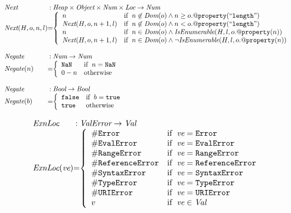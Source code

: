 \documentclass[a4paper, leqno]{amsart}
\newcommand{\false}{{\tt false}}
\newcommand{\true}{{\tt true}}
\newcommand{\Bool}{\emph{Bool}}
\newcommand{\ValError}{\emph{ValError}}
\newcommand{\Val}{\emph{Val}}
\newcommand{\Loc}{\emph{Loc}}
\newcommand{\Obj}{\emph{Object}}
\newcommand{\Num}{\emph{Num}}
\newcommand{\Heap}{\emph{Heap}}
\newcommand{\hf}[1]{\emph{#1}}
\newcommand{\ifc}[1]{{\rm if}\begin{array}[t]{l}#1\end{array}}
\begin{document}
\[\begin{array}{l@{}c@{}l}
\hf{Next} & :& \Heap \times \Obj \times \Num \times \Loc \rightarrow \Num \\
\hf{Next}(H, o, n, l) &=&
\left\{ \begin{array}{ll}
n &\ifc{n \not\in\hf{Dom}(o) \wedge n \ge o.{\tt@property}(``{\tt length}")}\\
\hf{Next}(H, o, n+1, l) &\ifc{n \not\in\hf{Dom}(o) \wedge n < o.{\tt@property}(``{\tt length}")}\\
n &\ifc{n \in\hf{Dom}(o) \wedge \hf{IsEnumerable}(H, l, o.{\tt@property}(n))}\\
\hf{Next}(H, o, n+1, l)
 &\ifc{n \in\hf{Dom}(o) \wedge \neg\hf{IsEnumerable}(H, l, o.{\tt@property}(n))}\\
\end{array}
\right.
\\\\

\hf{Negate} & :& \Num \rightarrow \Num \\
\hf{Negate}(n) &=&
\left\{ \begin{array}{ll}
{\tt NaN} &\ifc{n = {\tt NaN}}\\
0-n &\mbox{otherwise}\\
\end{array}
\right.
\\\\

\hf{Negate} & :& \Bool \rightarrow \Bool \\
\hf{Negate}(b) &=&
\left\{ \begin{array}{ll}
\false &\ifc{b = \true}\\
\true &\mbox{otherwise}\\
\end{array}
\right.
\end{array}
\]

\[
\begin{array}{l@{}c@{}l}
\hf{ExnLoc} & :& \ValError \rightarrow \Val \\
\hf{ExnLoc}(\emph{ve}) &=&
\left\{ \begin{array}{ll}
{\tt \#Error} &\ifc{\emph{ve} = {\tt Error}}\\
{\tt \#EvalError} &\ifc{\emph{ve} = {\tt EvalError}}\\
{\tt \#RangeError} &\ifc{\emph{ve} = {\tt RangeError}}\\
{\tt \#ReferenceError} &\ifc{\emph{ve} = {\tt ReferenceError}}\\
{\tt \#SyntaxError} &\ifc{\emph{ve} = {\tt SyntaxError}}\\
{\tt \#TypeError} &\ifc{\emph{ve} = {\tt TypeError}}\\
{\tt \#URIError} &\ifc{\emph{ve} = {\tt URIError}}\\
v&\ifc{\emph{ve} \in \Val}\\
\end{array}
\right.
\\\\
\end{array}
\]
\end{document}
